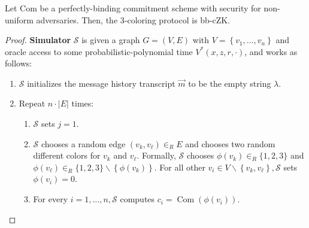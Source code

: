 \documentclass{beamer}
\begin{document}
    \begin{frame}
        \frametitle{}
    
        \begin{theorem}
            Let $\mathrm{Com}$ be a perfectly-binding commitment scheme with security for non-uniform adversaries. Then, the 3-coloring protocol is bb-cZK.
        \end{theorem}
        \begin{proof}
            \textbf{Simulator} $\mathcal{S}$ is given a graph $G=(V, E)$ with $V=\left\{v_{1}, \ldots, v_{n}\right\}$ and oracle access to some probabilistic-polynomial time $V^{*}(x, z, r, \cdot)$, and works as follows:
            \begin{enumerate}
                \item $\mathcal{S}$ initializes the message history transcript $\vec{m}$ to be the empty string $\lambda$.
                \item Repeat $n \cdot|E|$ times:
                \begin{enumerate}[a]
                    \item $\mathcal{S}$ sets $j=1$.
                    \item $\mathcal{S}$ chooses a random edge $\left(v_{k}, v_{\ell}\right) \in_{R} E$ and chooses two random different colors for $v_{k}$ and $v_{\ell}$. Formally, $\mathcal{S}$ chooses $\phi\left(v_{k}\right) \in_{R}\{1,2,3\}$ and $\phi\left(v_{\ell}\right) \in_{R}\{1,2,3\} \backslash\left\{\phi\left(v_{k}\right)\right\}$. For all
                    other $v_{i} \in V \backslash\left\{v_{k}, v_{\ell}\right\}, \mathcal{S}$ sets $\phi\left(v_{i}\right)=0$.
                    \item For every $i=1, \ldots, n, \mathcal{S}$ computes $c_{i}=\operatorname{Com}\left(\phi\left(v_{i}\right)\right)$.
                \end{enumerate}
                
            \end{enumerate}
        \end{proof}

    
    \end{frame}

 
\end{document}
